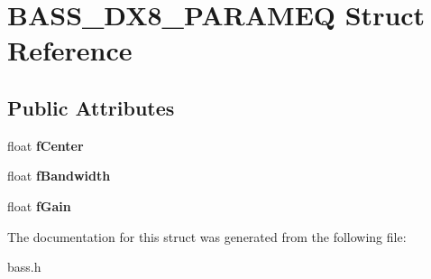 \section{B\+A\+S\+S\+\_\+\+D\+X8\+\_\+\+P\+A\+R\+A\+M\+E\+Q Struct Reference}
\label{struct_b_a_s_s___d_x8___p_a_r_a_m_e_q}
\subsection*{Public Attributes}
\begin{DoxyCompactItemize}
\item 
float {\bfseries f\+Center}\label{struct_b_a_s_s___d_x8___p_a_r_a_m_e_q_ab0774aabf58f7e8eb28213a710713c4e}

\item 
float {\bfseries f\+Bandwidth}\label{struct_b_a_s_s___d_x8___p_a_r_a_m_e_q_a93e4f82cbba760d52f2f3b0703c36b8b}

\item 
float {\bfseries f\+Gain}\label{struct_b_a_s_s___d_x8___p_a_r_a_m_e_q_ab573fd8cee48cc9ce5d0c2264bc0394d}

\end{DoxyCompactItemize}


The documentation for this struct was generated from the following file\+:\begin{DoxyCompactItemize}
\item 
bass.\+h\end{DoxyCompactItemize}
